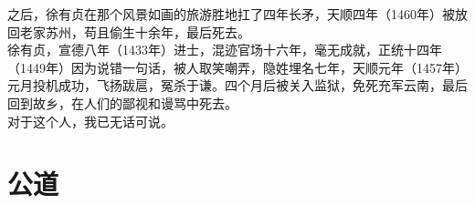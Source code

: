 \begin{multicols}{\theparacolNo}
之后，徐有贞在那个风景如画的旅游胜地扛了四年长矛，天顺四年（1460年）被放回老家苏州，苟且偷生十余年，最后死去。\\

徐有贞，宣德八年（1433年）进士，混迹官场十六年，毫无成就，正统十四年（1449年）因为说错一句话，被人取笑嘲弄，隐姓埋名七年，天顺元年（1457年）元月投机成功，飞扬跋扈，冤杀于谦。四个月后被关入监狱，免死充军云南，最后回到故乡，在人们的鄙视和谩骂中死去。\\

对于这个人，我已无话可说。\\
\ifnum{}
	\end{multicols}
\fi
\newpage
\section{公道}
\ifnum{}
